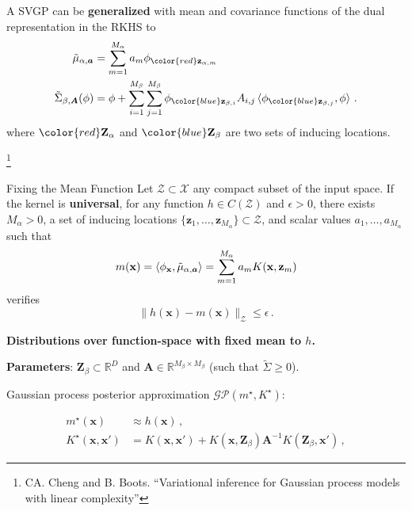 \documentclass[aspectratio=149]{beamer}
\begin{document}
    \begin{frame}
        A SVGP can be \textbf{\color{orange}generalized} with mean and covariance functions of the dual representation in the RKHS to
        \begin{equation*}
        \begin{aligned}
            \tilde{\mu}_{\alpha, \bm a} &= \sum_{m=1}^{M_\alpha} a_m \phi_{\color{red}\mathbf{z}_{\alpha, m}}\\
            \tilde{\Sigma}_{\beta, \bm{A}}(\phi) &= \phi + \sum_{i=1}^{M_ \beta}\sum_{j=1}^{M_\beta}\phi_{\color{blue}\mathbf{z}_{\beta, i}} A_{i,j} \braket{\phi_{\color{blue}\mathbf{z}_{\beta, j}}, \phi}\,.
        \end{aligned}
        \end{equation*}
        where \(\color{red}\mathbf{Z}_\alpha\) and \(\color{blue}\mathbf{Z}_\beta\) are two sets of inducing locations.
        
    {\let\thefootnote\relax\footnote{{CA. Cheng and B. Boots. ``Variational inference for Gaussian process models with linear complexity''}}}
    \end{frame}
    \begin{frame}{Fixing the Mean Function}
            Let \(\mathcal{Z} \subset \mathcal{X}\) any compact subset of the input space. If the kernel is \textbf{\color{orange}universal}, for any function \(h \in C(\mathcal{Z})\) and \(\epsilon > 0 \), there exists \(M_\alpha > 0\), a set of inducing locations \(\{\mathbf{z}_1, \dots, \mathbf{z}_{M_\alpha}\} \subset \mathcal{Z}\), and scalar values \(a_1, \dots, a_{M_\alpha}\) such that
            \[
                m(\mathbf{x}) = \braket{\phi_{\mathbf{x}}, \tilde{\mu}_{\alpha, \bm{a}}} = \sum_{m=1}^{M_\alpha}a_m K(\mathbf{x}, \mathbf{z}_m) 
            \]
            verifies
            \[
            \big\|h(\mathbf{x}) -  m(\mathbf{x})\big\|_{\mathcal{Z}} \leq \epsilon\,.
            \]
    \end{frame}
\begin{frame}
        \begin{center}
            \textbf{Distributions over function-space with fixed mean to \(h\).}
        \end{center}
        \pause
        \begin{center}
        \textbf{Parameters}: \(\mathbf{Z}_{\beta} \subset \mathbb{R}^D\) and \(\bm{A} \in \mathbb{R}^{M_\beta \times M_\beta}\) (such that \(\tilde{\Sigma} \geq 0\)).
        \end{center}
        \pause
        \begin{center}  
        Gaussian process posterior approximation \(\mathcal{GP}(m^\star, K^\star)\):
        \end{center}
        \[
            \begin{aligned}
                m^{\star}(\mathbf{x}) &\approx h(\mathbf{x})\,, \\
                K^{\star}(\mathbf{x}, \mathbf{x}') &=K(\mathbf{x}, \mathbf{x}') +  K(\mathbf{x}, \mathbf{Z}_\beta)\bm{A}^{-1} K(\mathbf{Z}_\beta, \mathbf{x}')\,,
            \end{aligned}
        \]
    \end{frame}
\end{document}
